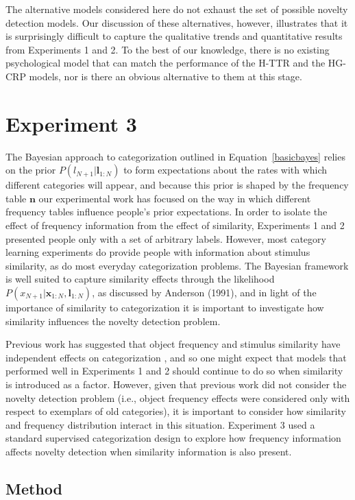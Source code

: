 \documentclass[doc]{apa6}
\begin{document}
The alternative models considered here do not exhaust the set of possible novelty detection models. Our discussion of these alternatives, however, illustrates that it is surprisingly difficult to capture the qualitative trends and quantitative results from Experiments 1 and 2. To the best of our knowledge, there is no existing psychological model that can match the performance of the H-TTR and the HG-CRP models, nor is there an obvious alternative to them at this stage.


\section{Experiment 3}

The Bayesian approach to categorization outlined in Equation~\ref{basicbayes} relies on the prior $P(l_{N+1} | \bm{l}_{1:N})$ to form expectations about the rates with which different categories will appear, and because this prior is shaped by the frequency table $\bm{n}$ our experimental work has focused on the way in which different frequency tables influence people's prior expectations. In order to isolate the effect of frequency information from the effect of similarity, Experiments 1 and 2 presented people only with a set of arbitrary labels. However, most category learning experiments do provide people with information about stimulus similarity, as do most everyday categorization problems. The Bayesian framework is well suited to capture similarity effects through the likelihood  $P(x_{N+1} | \bm{x}_{1:N}, \bm{l}_{1:N})$, as discussed by Anderson (1991), and in light of the importance of similarity to categorization it is important to investigate how similarity influences the novelty detection problem.

Previous work has suggested that object frequency and stimulus similarity have independent effects on categorization \cite{nosofsky_similarity_1988}, and so one might expect that models that performed well in Experiments 1 and 2 should continue to do so when similarity is introduced as a factor. However, given that previous work did not consider the novelty detection problem (i.e., object frequency effects were considered only with respect to exemplars of old categories), it is important to consider how similarity and frequency distribution interact in this situation. Experiment 3 used a standard supervised categorization design to explore how frequency information affects novelty detection when similarity information is also present.

\subsection{Method}
\end{document}
